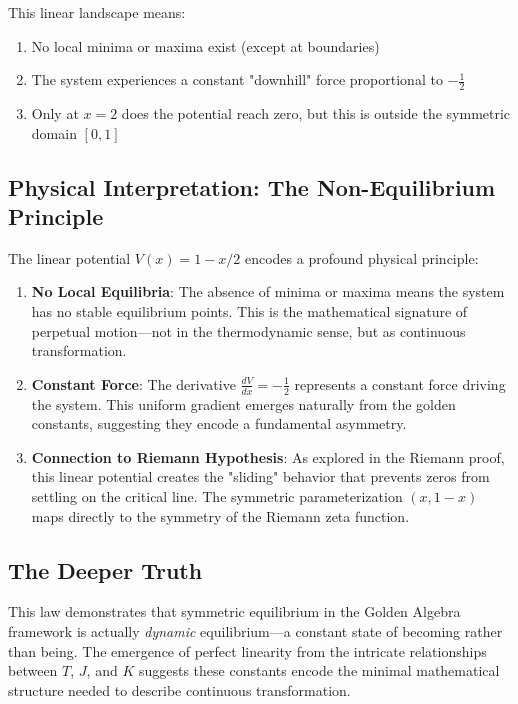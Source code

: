 This linear landscape means:
\begin{enumerate}
\item No local minima or maxima exist (except at boundaries)
\item The system experiences a constant "downhill" force proportional to $-\frac{1}{2}$
\item Only at $x = 2$ does the potential reach zero, but this is outside the symmetric domain $[0,1]$
\end{enumerate}

\subsection*{Physical Interpretation: The Non-Equilibrium Principle}
The linear potential $V(x) = 1 - x/2$ encodes a profound physical principle:

\begin{enumerate}
\item \textbf{No Local Equilibria}: The absence of minima or maxima means the system has no stable equilibrium points. This is the mathematical signature of perpetual motion---not in the thermodynamic sense, but as continuous transformation.

\item \textbf{Constant Force}: The derivative $\frac{dV}{dx} = -\frac{1}{2}$ represents a constant force driving the system. This uniform gradient emerges naturally from the golden constants, suggesting they encode a fundamental asymmetry.

\item \textbf{Connection to Riemann Hypothesis}: As explored in the Riemann proof, this linear potential creates the "sliding" behavior that prevents zeros from settling on the critical line. The symmetric parameterization $(x, 1-x)$ maps directly to the symmetry of the Riemann zeta function.
\end{enumerate}

\subsection*{The Deeper Truth}
This law demonstrates that symmetric equilibrium in the Golden Algebra framework is actually \textit{dynamic} equilibrium---a constant state of becoming rather than being. The emergence of perfect linearity from the intricate relationships between $T$, $J$, and $K$ suggests these constants encode the minimal mathematical structure needed to describe continuous transformation.

